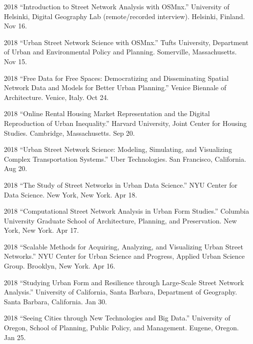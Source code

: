 \documentclass[12pt,letterpaper]{report}
\begin{document}
\begin{tablist}
        \item[2018] \tab \enquote{Introduction to Street Network Analysis with OSMnx.} University of Helsinki, Digital Geography Lab (remote/recorded interview). Helsinki, Finland. Nov 16.

        \item[2018] \tab \enquote{Urban Street Network Science with OSMnx.} Tufts University, Department of Urban and Environmental Policy and Planning. Somerville, Massachusetts. Nov 15.

        \item[2018] \tab \enquote{Free Data for Free Spaces: Democratizing and Disseminating Spatial Network Data and Models for Better Urban Planning.} Venice Biennale of Architecture. Venice, Italy. Oct 24.

        \item[2018] \tab \enquote{Online Rental Housing Market Representation and the Digital Reproduction of Urban Inequality.} Harvard University, Joint Center for Housing Studies. Cambridge, Massachusetts. Sep 20.

        \item[2018] \tab \enquote{Urban Street Network Science: Modeling, Simulating, and Visualizing Complex Transportation Systems.} Uber Technologies. San Francisco, California. Aug 20.

        \item[2018] \tab \enquote{The Study of Street Networks in Urban Data Science.} NYU Center for Data Science. New York, New York. Apr 18.

        \item[2018] \tab \enquote{Computational Street Network Analysis in Urban Form Studies.} Columbia University Graduate School of Architecture, Planning, and Preservation. New York, New York. Apr 17.

        \item[2018] \tab \enquote{Scalable Methods for Acquiring, Analyzing, and Visualizing Urban Street Networks.} NYU Center for Urban Science and Progress, Applied Urban Science Group. Brooklyn, New York. Apr 16.

        \item[2018] \tab \enquote{Studying Urban Form and Resilience through Large-Scale Street Network Analysis.} University of California, Santa Barbara, Department of Geography. Santa Barbara, California. Jan 30.

        \item[2018] \tab \enquote{Seeing Cities through New Technologies and Big Data.} University of Oregon, School of Planning, Public Policy, and Management. Eugene, Oregon. Jan 25.


\end{tablist}
\end{document}
